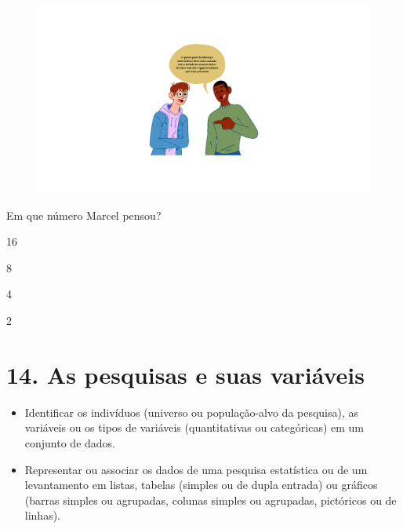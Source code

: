 \begin{figure}[htpb!]
\includegraphics[width=\textwidth]{../ilustracoes/MAT5/SAEB_5ANO_MAT_figura94.png}
\end{figure}

Em que número Marcel pensou?

\begin{escolha}
\item
  16
\item
  8
\item
  4
\item
  2
\end{escolha}



\chapter{14. As pesquisas e suas variáveis}


\begin{itemize}
\item Identificar os indivíduos (universo ou população-alvo da pesquisa),
as variáveis ou os tipos de variáveis (quantitativas ou categóricas) em 
um conjunto de dados.

\item Representar ou associar os dados de uma pesquisa estatística ou
de um levantamento em listas, tabelas (simples ou de dupla entrada) ou
gráficos (barras simples ou agrupadas, colunas simples ou agrupadas,
pictóricos ou de linhas).
\end{itemize}

